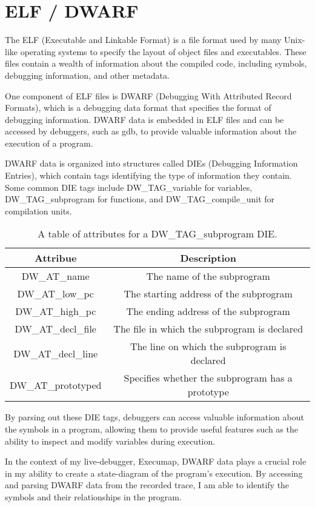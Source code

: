 \section{ELF / DWARF}
The ELF (Executable and Linkable Format) is a file format used by many Unix-like operating systems to specify the layout of object files and executables. These files contain a wealth of information about the compiled code, including symbols, debugging information, and other metadata.

One component of ELF files is DWARF (Debugging With Attributed Record Formats), which is a debugging data format that specifies the format of debugging information. DWARF data is embedded in ELF files and can be accessed by debuggers, such as gdb, to provide valuable information about the execution of a program.

DWARF data is organized into structures called DIEs (Debugging Information Entries), which contain tags identifying the type of information they contain. Some common DIE tags include DW\_TAG\_variable for variables, DW\_TAG\_subprogram for functions, and DW\_TAG\_compile\_unit for compilation units. \\

\begin{table}
\centering
\begin{tabular}{|c|c|}
\hline
\textbf{Attribue} & \textbf{Description} \\ \hline
DW\_AT\_name & The name of the subprogram \\ \hline
DW\_AT\_low\_pc & The starting address of the subprogram \\ \hline
DW\_AT\_high\_pc & The ending address of the subprogram \\ \hline
DW\_AT\_decl\_file & The file in which the subprogram is declared \\ \hline
DW\_AT\_decl\_line & The line on which the subprogram is declared \\ \hline
DW\_AT\_prototyped & Specifies whether the subprogram has a prototype \\ \hline
\end{tabular}
\caption{A table of attributes for a DW\_TAG\_subprogram DIE.}
\end{table}

By parsing out these DIE tags, debuggers can access valuable information about the symbols in a program, allowing them to provide useful features such as the ability to inspect and modify variables during execution.

In the context of my live-debugger, Execumap, DWARF data plays a crucial role in my ability to create a state-diagram of the program's execution. By accessing and parsing DWARF data from the recorded trace, I am able to identify the symbols and their relationships in the program.
